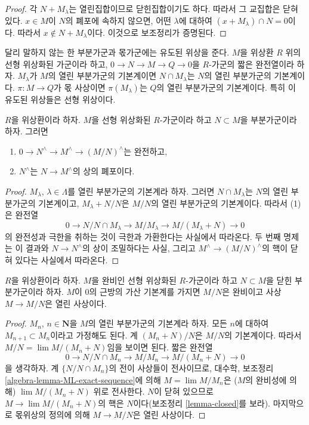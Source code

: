 \begin{proof}
각 $N + M_\lambda$는 열린집합이므로 닫힌집합이기도 하다.
따라서 그 교집합은 닫혀 있다. $x \in M$이 $N$의 폐포에 속하지
않으면, 어떤 $\lambda$에 대하여
$(x + M_\lambda) \cap N = 0$이다. 따라서
$x \not\in N + M_\lambda$이다. 이것으로 보조정리가 증명된다.
\end{proof}

\noindent
달리 말하지 않는 한 부분가군과 몫가군에는 유도된 위상을 준다.
$M$을 위상환 $R$ 위의 선형 위상화된 가군이라 하고,
$0 \to N \to M \to Q \to 0$을 $R$-가군의 짧은 완전열이라 하자.
$M_\lambda$가 $M$의 열린 부분가군의 기본계이면
$N \cap M_\lambda$는 $N$의 열린 부분가군의 기본계이다.
$\pi : M \to Q$가 몫 사상이면 $\pi(M_\lambda)$는 $Q$의 열린
부분가군의 기본계이다. 특히 이 유도된 위상들은 선형 위상이다.

\begin{lemma}
\label{lemma-closure}
$R$을 위상환이라 하자. $M$을 선형 위상화된 $R$-가군이라 하고
$N \subset M$을 부분가군이라 하자. 그러면
\begin{enumerate}
\item $0 \to N^\wedge \to M^\wedge \to (M/N)^\wedge$는 완전하고,
\item $N^\wedge$는 $N \to M^\wedge$의 상의 폐포이다.
\end{enumerate}
\end{lemma}

\begin{proof}
$M_\lambda$, $\lambda \in \Lambda$를 열린 부분가군의 기본계라 하자.
그러면 $N \cap M_\lambda$는 $N$의 열린 부분가군의 기본계이고,
$M_\lambda + N/N$은 $M/N$의 열린 부분가군의 기본계이다.
따라서 (1)은 완전열
$$
0 \to N/N \cap M_\lambda \to M/M_\lambda \to M/(M_\lambda + N) \to 0
$$
의 완전성과 극한을 취하는 것이 극한과 가환한다는 사실에서 따라온다.
두 번째 명제는 이 결과와 $N \to N^\wedge$의 상이 조밀하다는 사실,
그리고 $M^\wedge \to (M/N)^\wedge$의 핵이 닫혀 있다는 사실에서
따라온다.
\end{proof}

\begin{lemma}
\label{lemma-quotient-by-closed}
$R$을 위상환이라 하자. $M$을 완비인 선형 위상화된 $R$-가군이라
하고 $N \subset M$을 닫힌 부분가군이라 하자. $M$이 $0$의 근방의
가산 기본계를 가지면 $M/N$은 완비이고 사상 $M \to M/N$은 열린
사상이다.
\end{lemma}

\begin{proof}
$M_n$, $n \in \mathbf{N}$을 $M$의 열린 부분가군의 기본계라 하자.
모든 $n$에 대하여 $M_{n + 1} \subset M_n$이라고 가정해도 된다.
계 $(M_n + N)/N$은 $M/N$의 기본계이다. 따라서
$M/N = \lim M/(M_n + N)$임을 보이면 된다. 짧은 완전열
$$
0 \to N/N \cap M_n \to M/M_n \to M/(M_n + N) \to 0
$$
을 생각하자. 계 $\{N/N\cap M_n\}$의 전이 사상들이 전사이므로,
대수학, 보조정리 \ref{algebra-lemma-ML-exact-sequence}에 의해
$M = \lim M/M_n$은 ($M$의 완비성에 의해)
$\lim M/(M_n + N)$ 위로 전사한다. $N$이 닫혀 있으므로
$M \to \lim M/(M_n + N)$의 핵은 $N$이다(보조정리
\ref{lemma-closed}를 보라). 마지막으로 몫위상의 정의에 의해
$M \to M/N$은 열린 사상이다.
\end{proof}

